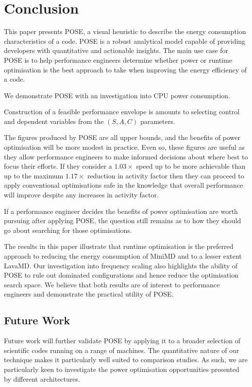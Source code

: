 \section{Conclusion}
\label{sec:conclusion}
This paper presents POSE, a visual heuristic to describe the energy consumption characteristics of a code.
POSE is a robust analytical model capable of providing developers with quantitative and actionable insights.
The main use case for POSE is to help performance engineers determine whether power or runtime optimisation is the best approach to take when improving the energy efficiency of a code.

We demonstrate POSE with an investigation into CPU power consumption.

Construction of a feasible performance envelope is amounts to selecting control and dependent variables from the $(S, A, C)$ parameters.

The figures produced by POSE are all upper bounds, and the benefits of power optimisation will be more modest in practice. Even so, these figures are useful as they allow performance engineers to make informed decisions about where best to focus their efforts. If they consider a $1.03 \times$ speed up to be more achievable than up to the maximum $1.17\times$ reduction in activity factor then they can proceed to apply conventional optimisations safe in the knowledge that overall performance will improve despite any increases in activity factor.

If a performance engineer decides the benefits of power optimisation are worth pursuing after applying POSE, the question still remains as to how they should go about searching for those optimisations.

The results in this paper illustrate that runtime optimisation is the preferred approach to reducing the energy consumption of MiniMD and to a lesser extent LavaMD.
Our investigation into frequency scaling also highlights the ability of POSE to rule out dominated configurations and hence reduce the optimisation search space.
We believe that both results are of interest to performance engineers and demonstrate the practical utility of POSE.

\subsection{Future Work}
Future work will further validate POSE by applying it to a broader selection of scientific codes running on a range of machines.
The quantitative nature of our technique makes it particularly well suited to comparison studies.
As such, we are particularly keen to investigate the power optimisation opportunities presented by different architectures.

